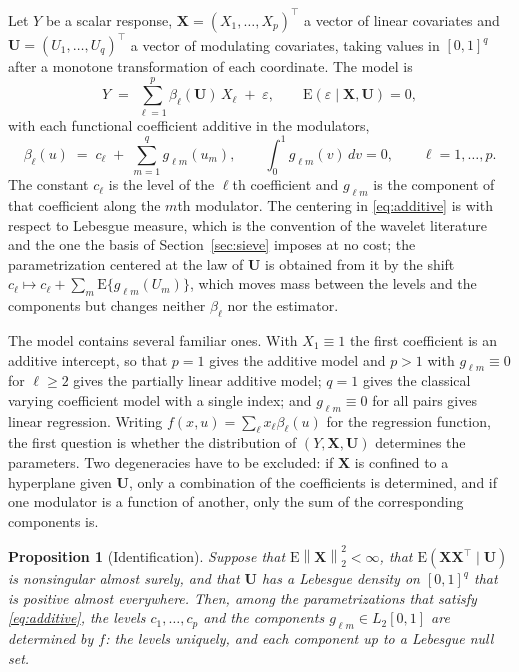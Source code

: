 \documentclass[12pt]{article} %
\newtheorem{proposition}{Proposition}
\theoremstyle{definition}
\theoremstyle{plain}
\newcommand{\E}{\mathrm{E}}
\newcommand{\T}{^{\top}}
\newcommand{\norm}[1]{\left\lVert #1 \right\rVert}
\newcommand{\cv}{\ell}
\newcommand{\md}{m}
\newcommand{\bX}{\mathbf{X}}
\newcommand{\bU}{\mathbf{U}}
\newcommand{\fcoef}[1]{\beta_{#1}}
\newcommand{\lvl}[1]{c_{#1}}
\newcommand{\gcomp}[2]{g_{#1#2}}
\begin{document}
Let $Y$ be a scalar response, $\bX = (X_1,\dots,X_p)\T$ a vector of linear
covariates and $\bU = (U_1,\dots,U_q)\T$ a vector of modulating covariates,
taking values in $[0,1]^q$ after a monotone transformation of each
coordinate. The model is
\begin{equation}
  \label{eq:model}
  Y \;=\; \sum_{\cv=1}^{p} \fcoef{\cv}(\bU)\,X_{\cv} \;+\; \varepsilon,
  \qquad \E(\varepsilon \mid \bX, \bU) = 0,
\end{equation}
with each functional coefficient additive in the modulators,
\begin{equation}
  \label{eq:additive}
  \fcoef{\cv}(u) \;=\; \lvl{\cv} \;+\; \sum_{\md=1}^{q}\gcomp{\cv}{\md}(u_{\md}),
  \qquad \int_{0}^{1}\gcomp{\cv}{\md}(v)\,dv = 0,
  \qquad \cv = 1,\dots,p .
\end{equation}
The constant $\lvl{\cv}$ is the level of the $\cv$th coefficient and
$\gcomp{\cv}{\md}$ is the component of that coefficient along the $\md$th
modulator. The centering in \eqref{eq:additive} is with respect to Lebesgue
measure, which is the convention of the wavelet literature and the one the
basis of Section~\ref{sec:sieve} imposes at no cost; the parametrization
centered at the law of $\bU$ is obtained from it by the shift
$\lvl{\cv} \mapsto \lvl{\cv} + \sum_{\md}\E\{\gcomp{\cv}{\md}(U_{\md})\}$,
which moves mass between the levels and the components but changes neither
$\fcoef{\cv}$ nor the estimator.

The model contains several familiar ones. With $X_1 \equiv 1$ the first
coefficient is an additive intercept, so that $p = 1$ gives the additive model
and $p > 1$ with $\gcomp{\cv}{\md} \equiv 0$ for $\cv \ge 2$ gives the
partially linear additive model; $q = 1$ gives the classical varying
coefficient model with a single index; and $\gcomp{\cv}{\md}\equiv 0$ for all
pairs gives linear regression. Writing
$f(x,u) = \sum_{\cv} x_{\cv}\fcoef{\cv}(u)$ for the regression function, the
first question is whether the distribution of $(Y,\bX,\bU)$ determines the
parameters. Two degeneracies have to be excluded: if $\bX$ is confined to a
hyperplane given $\bU$, only a combination of the coefficients is determined,
and if one modulator is a function of another, only the sum of the
corresponding components is.

\begin{proposition}[Identification]
\label{prop:identif}
Suppose that $\E\norm{\bX}_2^2 < \infty$, that $\E(\bX\bX\T \mid \bU)$ is
nonsingular almost surely, and that $\bU$ has a Lebesgue density on $[0,1]^q$
that is positive almost everywhere. Then, among the parametrizations that
satisfy \eqref{eq:additive}, the levels $\lvl{1},\dots,\lvl{p}$ and the
components $\gcomp{\cv}{\md} \in L_2[0,1]$ are determined by $f$: the levels
uniquely, and each component up to a Lebesgue null set.
\end{proposition}
\end{document}
